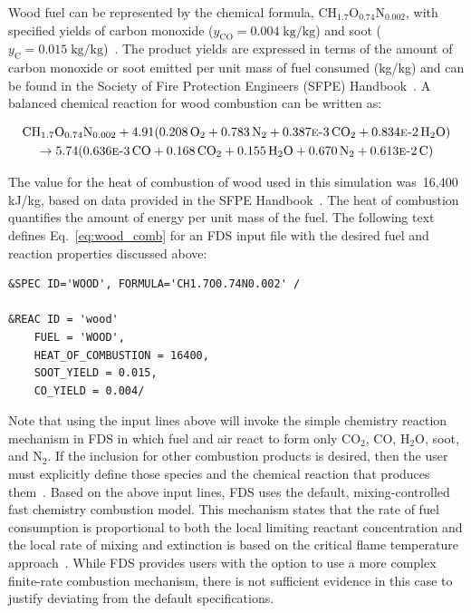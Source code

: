 \documentclass[12pt,oneside]{book}
\renewcommand{\C}{\mbox{C}}
\renewcommand{\H}{\mbox{H}}
\renewcommand{\O}{\mbox{O}}
\newcommand{\N}{\mbox{N}}
\begin{document}
Wood fuel can be represented by the chemical formula, $\C\H_{1.7}\O_{0.74}\N_{0.002}$, with specified yields of carbon monoxide ($y_{\mathrm{CO}}=0.004 \; \mathrm{kg}/\mathrm{kg}$) and soot ($y_{\mathrm{C}}=0.015 \; \mathrm{kg}/\mathrm{kg}$)~\cite{SFPE:Tewarson}. The product yields are expressed in terms of the amount of carbon monoxide or soot emitted per unit mass of fuel consumed (kg/kg) and can be found in the Society of Fire Protection Engineers (SFPE) Handbook~\cite{SFPE:Tewarson}. A balanced chemical reaction for wood combustion can be written as:

\begin{multline}
\C\H_{1.7}\O_{0.74}\N_{0.002} + 4.91(0.208\,\O_{2} + 0.783\,\N_{2} + 0.387\text{\sc{e}-}3\,\C\O_{2} + 0.834\text{\sc{e}-}2\,\H_{2}\O) \\ 
\rightarrow 5.74(0.636\text{\sc{e}-}3\,\C\O + 0.168\,\C\O_{2} + 0.155\,\H_{2}\O + 0.670\,\N_{2} + 0.613\text{\sc{e}-}2\,\C)
\label{eq:wood_comb}
\end{multline}

The value for the heat of combustion of wood used in this simulation was~16,400 kJ/kg, based on data provided in the SFPE Handbook~\cite{SFPE:Tewarson}. The heat of combustion quantifies the amount of energy per unit mass of the fuel. The following text defines Eq.~\ref{eq:wood_comb} for an FDS input file with the desired fuel and reaction properties discussed above:

\begin{lstlisting}
&SPEC ID='WOOD', FORMULA='CH1.7O0.74N0.002' /

&REAC ID = 'wood' 
    FUEL = 'WOOD', 
    HEAT_OF_COMBUSTION = 16400,
    SOOT_YIELD = 0.015,
    CO_YIELD = 0.004/
\end{lstlisting}

Note that using the input lines above will invoke the simple chemistry reaction mechanism in FDS in which fuel and air react to form only CO$_2$, CO, H$_2$O, soot, and N$_2$. If the inclusion for other combustion products is desired, then the user must explicitly define those species and the chemical reaction that produces them~\cite{FDS_Users_Guide}. Based on the above input lines, FDS uses the default, mixing-controlled fast chemistry combustion model. This mechanism states that the rate of fuel consumption is proportional to both the local limiting reactant concentration and the local rate of mixing and extinction is based on the critical flame temperature approach~\cite{FDS_Math_Guide}. While FDS provides users with the option to use a more complex finite-rate combustion mechanism, there is not sufficient evidence in this case to justify deviating from the default specifications. 
\end{document}
